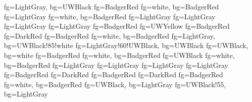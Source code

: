 \ifuwdark
        {fg=LightGray,  bg=UWBlack}
          {fg=BadgerRed}
         {fg=white,      bg=BadgerRed}
      {fg=LightGray}
              {fg=white,      bg=BadgerRed}
           {fg=LightGray}
             {fg=LightGray}
               {fg=LightGray}
          {fg=LightGray}
       {fg=BadgerRed}
       {fg=UWYellow}
       {fg=BadgerRed}
    {fg=DarkRed}
     {fg=BadgerRed}
        {fg=white,      bg=BadgerRed}
         {fg=LightGray,  bg=UWBlack!85!white}
           {fg=LightGray!60!UWBlack, bg=UWBlack}
\else
        {fg=UWBlack,    bg=white}
          {fg=BadgerRed}
         {fg=white,      bg=BadgerRed}
      {fg=UWBlack}
              {fg=white,      bg=BadgerRed}
           {fg=LightGray}
             {fg=LightGray}
               {fg=LightGray}
          {fg=LightGray}
       {fg=BadgerRed}
       {fg=DarkRed}
       {fg=BadgerRed}
    {fg=DarkRed}
     {fg=BadgerRed}
        {fg=white,      bg=BadgerRed}
         {fg=UWBlack,    bg=LightGray}
           {fg=UWBlack!55, bg=LightGray}
\fi

